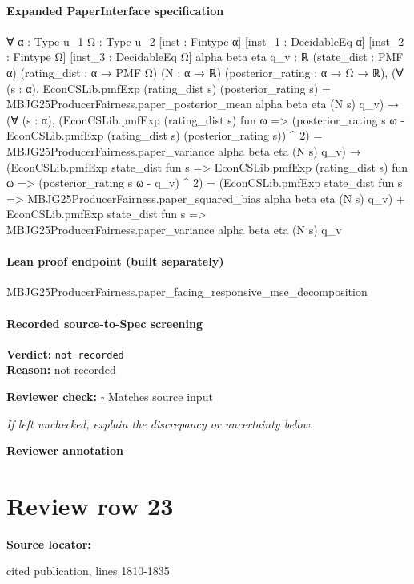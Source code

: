 \documentclass[10pt]{article}
\newcommand{\reviewerbox}{%
  \par\noindent\fbox{\parbox{0.96\linewidth}{\rule{0pt}{0.38in}}}\par
}
\newcommand{\reviewmatch}[1]{%
  \par\noindent\textbf{Reviewer check:} $\square$\; #1\par
  \noindent\emph{If left unchecked, explain the discrepancy or uncertainty below.}\par
}
\begin{document}
\paragraph{Expanded PaperInterface specification}
\begin{ReviewVerbatim}
∀ {α : Type u_1} {Ω : Type u_2} [inst : Fintype α] [inst_1 : DecidableEq α] [inst_2 : Fintype Ω]
  [inst_3 : DecidableEq Ω] {alpha beta eta q_v : ℝ} (state_dist : PMF α) (rating_dist : α → PMF Ω) (N : α → ℝ)
  (posterior_rating : α → Ω → ℝ),
  (∀ (s : α),
      EconCSLib.pmfExp (rating_dist s) (posterior_rating s) =
        MBJG25ProducerFairness.paper_posterior_mean alpha beta eta (N s) q_v) →
    (∀ (s : α),
        (EconCSLib.pmfExp (rating_dist s) fun ω =>
            (posterior_rating s ω - EconCSLib.pmfExp (rating_dist s) (posterior_rating s)) ^ 2) =
          MBJG25ProducerFairness.paper_variance alpha beta eta (N s) q_v) →
      (EconCSLib.pmfExp state_dist fun s =>
          EconCSLib.pmfExp (rating_dist s) fun ω => (posterior_rating s ω - q_v) ^ 2) =
        (EconCSLib.pmfExp state_dist fun s => MBJG25ProducerFairness.paper_squared_bias alpha beta eta (N s) q_v) +
          EconCSLib.pmfExp state_dist fun s => MBJG25ProducerFairness.paper_variance alpha beta eta (N s) q_v
\end{ReviewVerbatim}

\paragraph{Lean proof endpoint (built separately)}\begin{ReviewVerbatim}
MBJG25ProducerFairness.paper_facing_responsive_mse_decomposition
\end{ReviewVerbatim}

\paragraph{Recorded source-to-Spec screening}
\textbf{Verdict:} \texttt{not recorded}
\\
\textbf{Reason:} not recorded
\reviewmatch{Matches source input}
\noindent\textbf{Reviewer annotation}\par
\reviewerbox
\clearpage
\hypertarget{source-claim-8281b9d563b2f959}{}
\section*{Review row 23}
\textbf{Source locator:} {\footnotesize\raggedright cited publication, lines 1810-\allowbreak{}1835\par}
\end{document}
